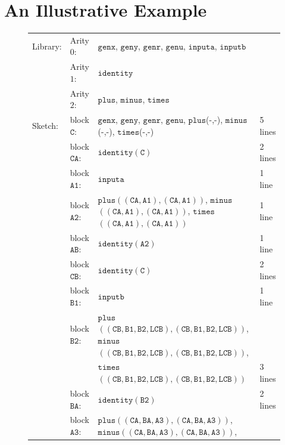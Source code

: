 \documentclass[preprint]{sig-alternate-05-2015}
\begin{document}
\def\genx{\mbox{${\mathtt{genx}}$}}
\def\geny{\mbox{${\mathtt{geny}}$}}
\def\genr{\mbox{${\mathtt{genr}}$}}
\def\gend{\mbox{${\mathtt{genu}}$}}
\def\inputa{\mbox{${\mathtt{inputa}}$}}
\def\inputb{\mbox{${\mathtt{inputb}}$}}
\def\plus{\mbox{${\mathtt{plus}}$}}
\def\minus{\mbox{${\mathtt{minus}}$}}
\def\timess{\mbox{${\mathtt{times}}$}}
\def\identity{\mbox{${\mathtt{identity}}$}}

\section{An Illustrative Example}\label{sec:ex}

\begin{figure}[tb]
  \begin{tabular}{|llll|}
    \hline
    Library: &
    Arity $0$: & \genx, \geny, \genr, \gend, \inputa, \inputb &
    \\ & 
    Arity $1$: &  \identity&
    \\ &
    Arity $2$: & \plus, \minus, \timess&
     \\ \hline
     Sketch: &
     block $\mathtt{C}$: & \genx, \geny, \genr, \gend, \plus(-,-), \minus(-,-), \timess(-,-) & 5 lines
     \\ &
     block $\mathtt{CA}$: & \identity$(\mathtt{C})$ & 2 lines
     \\ &
     block $\mathtt{A1}$: & \inputa & 1 line
     \\ &
     block $\mathtt{A2}$: & 
     \plus$\mathtt{( (CA,A1), (CA,A1) )}$, 
     \minus$\mathtt{( (CA,A1), (CA,A1) )}$, 
     \timess$\mathtt{( (CA,A1), (CA,A1) )}$ & 1 line
       \\ &
     block $\mathtt{AB}$: & \identity$\mathtt{(A2)}$ & 1 line
       \\ &
     block $\mathtt{CB}$: & \identity$\mathtt{(C)}$  & 2 lines
       \\ &
       block $\mathtt{B1}$: & \inputb & 1 line
       \\ &
       block $\mathtt{B2}$: & 
     \plus$\mathtt{( (CB,B1,B2,LCB), (CB,B1,B2,LCB) )}$, 
     \minus$\mathtt{( (CB,B1,B2,LCB), (CB,B1,B2,LCB) )}$, &
     \\ & &
     \timess$\mathtt{( (CB,B1,B2,LCB), (CB,B1,B2,LCB) )}$ & 3 lines
       \\ &
       block $\mathtt{BA}$: & \identity$\mathtt{(B2)}$ & 2 lines
       \\ &
       block $\mathtt{A3}$: & 
       \plus$\mathtt{( (CA,BA,A3), (CA,BA,A3) )}$, 
       \minus$\mathtt{( (CA,BA,A3), (CA,BA,A3) )}$, &

\end{tabular}
\end{figure}
\end{document}
